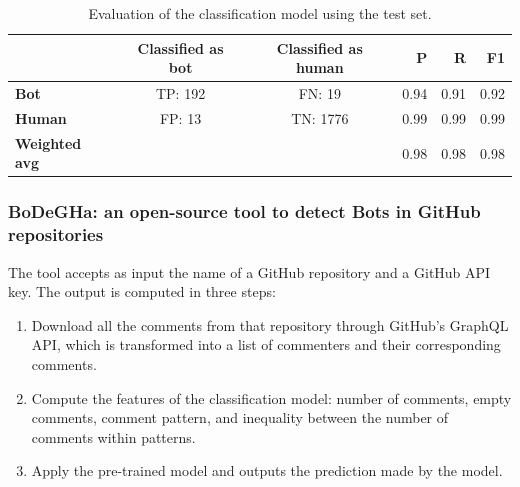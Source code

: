 \documentclass[a4paper, 12pt]{book}
\begin{document}

\begin{table}[htb]  %
 \renewcommand{\arraystretch}{1.2}  %
 \begin{center}
  \begin{tabular}{  l  c  c  r  r  r }
    \toprule    %
      & \textbf{Classified as bot} & \textbf{Classified as human} & \textbf{P} & \textbf{R} & \textbf{F1} \\ 
      \midrule %
    \textbf{Bot} & TP: 192 & FN: 19 & 0.94 & 0.91 & 0.92 \\ %
    \textbf{Human} & FP: 13 & TN: 1776 & 0.99 & 0.99 & 0.99 \\ %
    \textbf{Weighted avg} &  &  & 0.98 & 0.98 & 0.98 \\
    \bottomrule     %
  \end{tabular}
  \caption{Evaluation of the classification model using the test set.}
  \label{table:golzadeh-table-results}
 \end{center}
\end{table}

\subsubsection{BoDeGHa: an open-source tool to detect Bots in GitHub repositories}
\label{sssec:golzadeh-tool}

The tool accepts as input the name of a GitHub repository and a GitHub API key. The output is computed in three steps:
\begin{enumerate}
    \item Download all the comments from that repository through GitHub's GraphQL API, which is transformed into a list of commenters and their corresponding comments.
    \item Compute the features of the classification model: number of comments, empty comments, comment pattern, and inequality between the number of comments within patterns.
    \item Apply the pre-trained model and outputs the prediction made by the model.
\end{enumerate}
\end{document}
